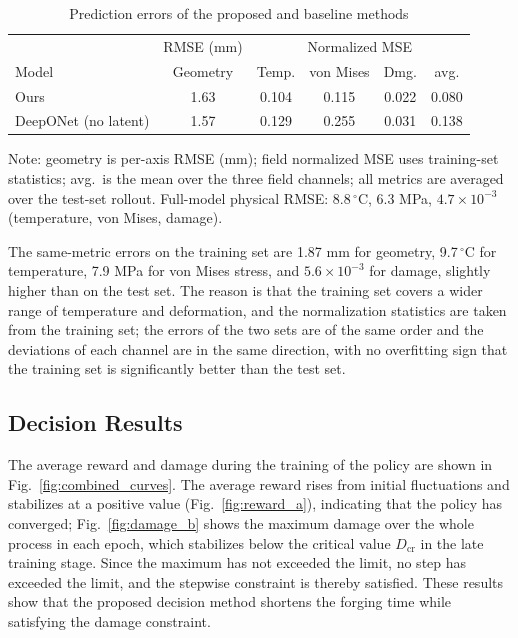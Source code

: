 \begin{table}[H]
\centering
\caption{Prediction errors of the proposed and baseline methods}
\label{tab:model_error}
\setlength{\tabcolsep}{5pt}
\footnotesize
\begin{tabular}{l c c c c c}
\toprule
 & RMSE (mm) & \multicolumn{4}{c}{Normalized MSE} \\
Model & Geometry & Temp. & von Mises & Dmg. & avg. \\
\midrule
Ours & 1.63 & 0.104 & 0.115 & 0.022 & 0.080 \\
DeepONet (no latent) & 1.57 & 0.129 & 0.255 & 0.031 & 0.138 \\
\bottomrule
\end{tabular}

\vspace{2pt}
{\footnotesize Note: geometry is per-axis RMSE (mm); field normalized MSE uses training-set statistics; avg.\ is the mean over the three field channels; all metrics are averaged over the test-set rollout. Full-model physical RMSE: 8.8\,$^{\circ}$C, 6.3 MPa, $4.7\times10^{-3}$ (temperature, von Mises, damage).}
\end{table}

The same-metric errors on the training set are 1.87 mm for geometry, 9.7\,$^{\circ}$C for temperature, 7.9 MPa for von Mises stress, and $5.6\times10^{-3}$ for damage, slightly higher than on the test set. The reason is that the training set covers a wider range of temperature and deformation, and the normalization statistics are taken from the training set; the errors of the two sets are of the same order and the deviations of each channel are in the same direction, with no overfitting sign that the training set is significantly better than the test set.




\subsection{Decision Results}
The average reward and damage during the training of the policy are shown in Fig.~\ref{fig:combined_curves}. The average reward rises from initial fluctuations and stabilizes at a positive value (Fig.~\ref{fig:reward_a}), indicating that the policy has converged; Fig.~\ref{fig:damage_b} shows the maximum damage over the whole process in each epoch, which stabilizes below the critical value $D_{\text{cr}}$ in the late training stage. Since the maximum has not exceeded the limit, no step has exceeded the limit, and the stepwise constraint is thereby satisfied. These results show that the proposed decision method shortens the forging time while satisfying the damage constraint.

